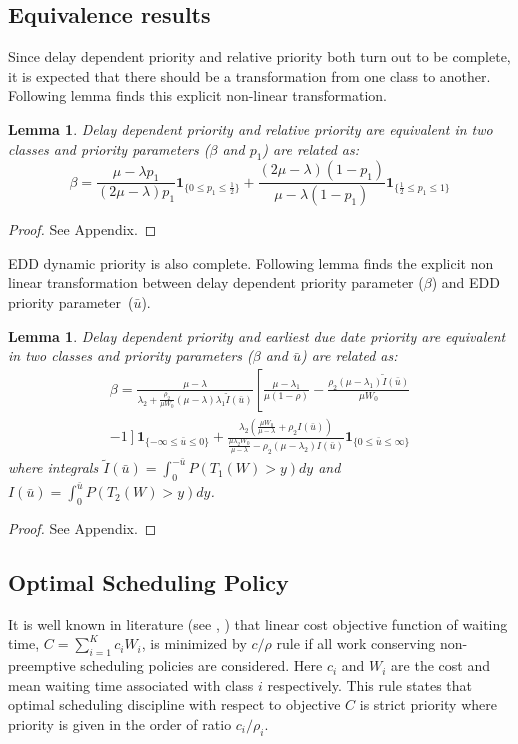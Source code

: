 \documentclass[a4paper,12pt]{article}
\newtheorem{lem}[thm]{Lemma}
\begin{document}
\subsection{Equivalence results}
Since delay dependent priority and relative priority both turn out to be complete, it is expected that there should be a transformation from one class to another. Following lemma finds this explicit non-linear transformation. 
\begin{lem}\label{clm:equivalenceDDPnRP}
\textit{Delay dependent priority and relative priority are equivalent in two classes and priority parameters ($\beta$ and $p_1$) are related as:}
\begin{equation}
\beta = \frac{\mu-\lambda p_1}{(2\mu-\lambda)p_1}\mathbf{1}_{\{0 \le  p_1 \le \frac{1}{2}\}} + \frac{(2\mu-\lambda)(1-p_1)}{\mu-\lambda(1-p_1)}\mathbf{1}_{\{\frac{1}{2} \le  p_1 \le 1\}}
\end{equation}
\end{lem}
\begin{proof}
See Appendix.
\end{proof}
EDD dynamic priority is also complete. Following lemma finds the explicit non linear transformation between delay dependent priority parameter ($\beta$) and EDD priority parameter~($\bar{u}$).
\begin{lem}\label{clm:equivalenceDDPnEDD}
\textit{Delay dependent priority and earliest due date priority are equivalent in two classes and priority parameters ($\beta$ and $\bar{u}$) are related as:}
\begin{eqnarray}\nonumber
\beta = \frac{\mu-\lambda}{\lambda_2+\frac{\rho_2}{\mu W_0}(\mu-\lambda)\lambda_1 \tilde{I}(\bar{u})}\left[\frac{\mu-\lambda_1}{\mu(1 - \rho)} - \frac{\rho_2(\mu-\lambda_1)\tilde{I}(\bar{u})}{\mu W_0}\right.\\\nonumber
 - \left.1\right]\mathbf{1}_{\{-\infty \le  \bar{u} \le 0\}} + \frac{\lambda_2\left( \frac{\mu W_0}{\mu-\lambda} + \rho_2 I(\bar{u})\right)}{\frac{\mu \lambda_2 W_0}{\mu-\lambda}	-\rho_2(\mu-\lambda_2)I(\bar{u})}\mathbf{1}_{\{0 \le  \bar{u} \le \infty\}}
\end{eqnarray}
where integrals $\tilde{I}(\bar{u})=\int_0^{-\bar{u}}P(T_1(W)>y)dy$ and $I(\bar{u})=\int_0^{\bar{u}}P(T_2(W)>y)dy$. 
\end{lem}
\begin{proof}
See Appendix.
\end{proof}

\subsection{Optimal Scheduling Policy}
It is well known in literature (see \cite[page 110]{mitranibook}, \cite{yao2002dynamic}) that linear cost objective function of waiting time, $C=\sum_{i=1}^{K}c_iW_i$, is minimized by $c/\rho$ rule if all work conserving non-preemptive scheduling policies are considered. Here $c_i$ and $W_i$ are the cost and mean waiting time associated with class $i$ respectively. This rule states that optimal scheduling discipline with respect to objective $C$ is strict priority where priority is given in the order of ratio $c_i/\rho_i$.  
\end{document}
